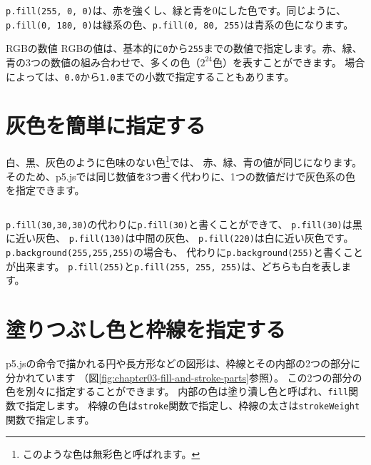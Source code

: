 \texttt{p.fill(255, 0, 0)}は、赤を強くし、緑と青を0にした色です。同じように、\texttt{p.fill(0, 180, 0)}は緑系の色、\texttt{p.fill(0, 80, 255)}は青系の色になります。

\begin{pointbox}{RGBの数値}
RGBの値は、基本的に\texttt{0}から\texttt{255}までの数値で指定します。赤、緑、青の3つの数値の組み合わせで、多くの色（$2^{24}$色）を表すことができます。
場合によっては、\texttt{0.0}から\texttt{1.0}までの小数で指定することもあります。
\end{pointbox}

\section{灰色を簡単に指定する}

白、黒、灰色のように色味のない色\footnote{このような色は無彩色と呼ばれます。}では、
赤、緑、青の値が同じになります。そのため、p5.jsでは同じ数値を3つ書く代わりに、1つの数値だけで灰色系の色を指定できます。

\begin{listing}[htbp]
\inputminted{ts}{typescript-p5/listings/chapter03/grayscale-colors.ts}
\caption{1つの数値で灰色系の色を指定する（\texttt{chapter03/grayscale-colors.ts}）}
\label{lst:chapter03-grayscale-colors}
\end{listing}

\texttt{p.fill(30,30,30)}の代わりに\texttt{p.fill(30)}と書くことができて、
\texttt{p.fill(30)}は黒に近い灰色、
\texttt{p.fill(130)}は中間の灰色、
\texttt{p.fill(220)}は白に近い灰色です。
\texttt{p.background(255,255,255)}の場合も、
代わりに\texttt{p.background(255)}と書くことが出来ます。
\texttt{p.fill(255)}と\texttt{p.fill(255, 255, 255)}は、どちらも白を表します。

\section{塗りつぶし色と枠線を指定する}

p5.jsの命令で描かれる円や長方形などの図形は、枠線とその内部の2つの部分に分かれています
（図\ref{fig:chapter03-fill-and-stroke-parts}参照）。
この2つの部分の色を別々に指定することができます。
内部の色は塗り潰し色と呼ばれ、\texttt{fill}関数で指定します。
枠線の色は\texttt{stroke}関数で指定し、枠線の太さは\texttt{strokeWeight}関数で指定します。

